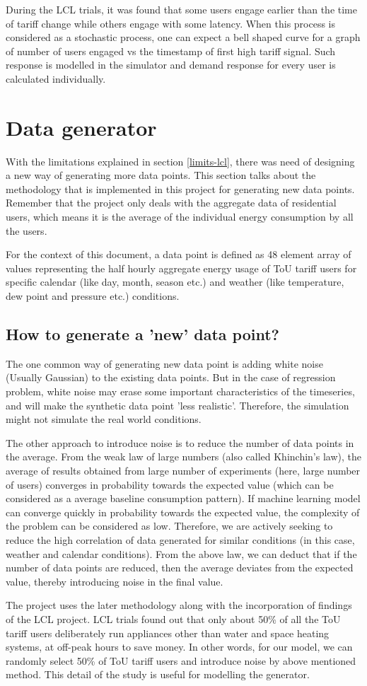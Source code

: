 During the LCL trials, it was found that some users engage earlier than the time of tariff change while others engage with some latency. When this process is considered as a stochastic process, one can expect a bell shaped curve for a graph of number of users engaged vs the timestamp of first high tariff signal. Such response is modelled in the simulator and demand response for every user is calculated individually.

\section{Data generator}
With the limitations explained in section \ref{limits-lcl}, there was need of designing a new way of generating more data points. This section talks about the methodology that is implemented in this project for generating new data points. Remember that the project only deals with the aggregate data of residential users, which means it is the average of the individual energy consumption by all the users.

For the context of this document, a data point is defined as 48 element array of values representing the half hourly aggregate energy usage of ToU tariff users for specific calendar (like day, month, season etc.) and weather (like temperature, dew point and pressure etc.) conditions.

\subsection{How to generate a 'new' data point?}
The one common way of generating new data point is adding white noise (Usually Gaussian) to the existing data points. But in the case of regression problem, white noise may erase some important characteristics of the timeseries, and will make the synthetic data point 'less realistic'. Therefore, the simulation might not simulate the real world conditions.

The other approach to introduce noise is to reduce the number of data points in the average. From the weak law of large numbers (also called Khinchin's law), the average of results obtained from large number of experiments (here, large number of users)  converges in probability towards the expected value (which can be considered as a average baseline consumption pattern). If machine learning model can converge quickly in probability towards the expected value, the complexity of the problem can be considered as low. Therefore, we are actively seeking to reduce the high correlation of data generated for similar conditions (in this case, weather and calendar conditions). From the above law, we can deduct that if the number of data points are reduced, then the average deviates from the expected value, thereby introducing noise in the final value.

The project uses the later methodology along with the incorporation of findings of the LCL project. LCL trials found out that only about 50\% of all the ToU tariff users deliberately run appliances other than water and space heating systems, at off-peak hours to save money. In other words, for our model, we can randomly select 50\% of ToU tariff users and introduce noise by above mentioned method. This detail of the study is useful for modelling the generator.